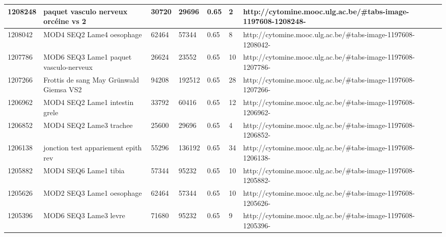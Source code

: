 \documentclass[a4paper,11pt]{report}
\numberwithin{figure}{section} %
\begin{document}
\begin{table}[]
{\begin{tabular}{|l|l|l|l|l|l|l|}
1208248  & paquet vasculo nerveux orc\'{e}ine vs 2                                                          & 30720  & 29696  & 0.65                  & 2           & http://cytomine.mooc.ulg.ac.be/\#tabs-image-1197608-1208248-  \\ \hline
1208042  & MOD4 SEQ2 Lame4 oesophage                                                                    & 62464  & 57344  & 0.65                  & 8           & http://cytomine.mooc.ulg.ac.be/\#tabs-image-1197608-1208042-  \\ \hline
1207786  & MOD6 SEQ3 Lame1 paquet vasculo-nerveux                                                       & 26624  & 23552  & 0.65                  & 10          & http://cytomine.mooc.ulg.ac.be/\#tabs-image-1197608-1207786-  \\ \hline
1207266  & Frottis de sang May Gr\"{u}nwald Giemsa VS2                                                      & 94208  & 192512 & 0.65                  & 28          & http://cytomine.mooc.ulg.ac.be/\#tabs-image-1197608-1207266-  \\ \hline
1206962  & MOD4 SEQ2 Lame1 intestin grele                                                               & 33792  & 60416  & 0.65                  & 12          & http://cytomine.mooc.ulg.ac.be/\#tabs-image-1197608-1206962-  \\ \hline
1206852  & MOD4 SEQ2 Lame3 trachee                                                                      & 25600  & 29696  & 0.65                  & 4           & http://cytomine.mooc.ulg.ac.be/\#tabs-image-1197608-1206852-  \\ \hline
1206138  & jonction test appariement epith rev                                                          & 55296  & 136192 & 0.65                  & 34          & http://cytomine.mooc.ulg.ac.be/\#tabs-image-1197608-1206138-  \\ \hline
1205882  & MOD4 SEQ6 Lame1 tibia                                                                        & 57344  & 95232  & 0.65                  & 10          & http://cytomine.mooc.ulg.ac.be/\#tabs-image-1197608-1205882-  \\ \hline
1205626  & MOD2 SEQ3 Lame1 oesophage                                                                    & 62464  & 57344  & 0.65                  & 10          & http://cytomine.mooc.ulg.ac.be/\#tabs-image-1197608-1205626-  \\ \hline
1205396  & MOD6 SEQ3 Lame3 levre                                                                        & 71680  & 95232  & 0.65                  & 9           & http://cytomine.mooc.ulg.ac.be/\#tabs-image-1197608-1205396-  \\ \hline

\end{tabular}}
\end{table}
\end{document}

